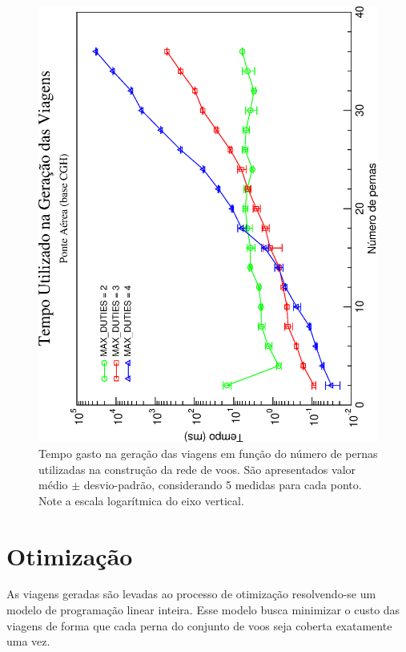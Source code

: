 \documentclass[12pt,a4paper]{article}
\begin{document}
\begin{figure}[htb]
	\begin{center}
		\includegraphics[scale=0.45,angle=-90]{fig/generation_time.eps}
		\caption{Tempo gasto na geração das viagens em função do número de pernas utilizadas na 
		construção da rede de voos. São apresentados valor médio $\pm$ desvio-padrão, considerando 5 
		medidas para cada ponto. Note a escala logarítmica do eixo vertical.}
		\label{fig:generation}
	\end{center}
\end{figure}


\section{Otimização}
\label{sec:otimizacao}

As viagens geradas são levadas ao processo de otimização resolvendo-se um modelo de programação 
linear inteira. Esse modelo busca minimizar o custo das viagens de forma que cada perna do conjunto
de voos seja coberta exatamente uma vez. 
\end{document}
